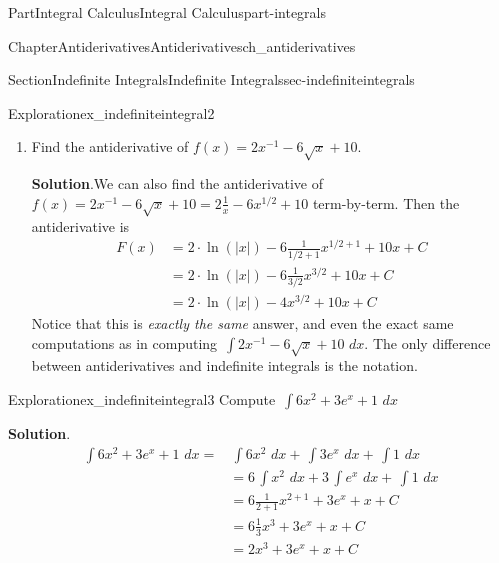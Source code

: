 \documentclass[oneside,10pt,]{tufte-book}
\newcommand{\blocktitlefont}{\relax}
\numberwithin{equation}{chapter}
\newcommand{\intdx}[1]{{\,\int#1\,\,dx}}
\newcommand{\amp}{&}
\begin{document}
\begin{partptx}{Part}{Integral Calculus}{}{Integral Calculus}{}{}{part-integrals}
\begin{chapterptx}{Chapter}{Antiderivatives}{}{Antiderivatives}{}{}{ch_antiderivatives}
\begin{sectionptx}{Section}{Indefinite Integrals}{}{Indefinite Integrals}{}{}{sec-indefiniteintegrals}
\begin{exploration}{Exploration}{}{ex_indefiniteintegral2}
\begin{enumerate}[font=\bfseries,label=(\alph*),ref=\alph*]
\begin{align*}
= \amp 2\intdx{\dfrac{1}{x}} - 6\intdx{x^{1/2}} + \intdx{10} \\
= \amp 2\ln(|x|) - 6\cdot \frac{1}{1/2+1} x^{1/2+1} + 10x + C\\
= \amp 2\ln(|x|) - 6\cdot \frac{1}{3/2}x^{3/2} + 10x + C\\
= \amp 2\ln(|x|) - 4 x^{3/2} + 10x + C
\end{align*}
%
\item{}Find the antiderivative of \(f(x) = 2x^{-1} - 6\sqrt{x} + 10\).%
\par\smallskip%
\noindent\textbf{\blocktitlefont Solution}.\hypertarget{ex_indefiniteintegral2-3-2}{}\quad{}We can also find the antiderivative of \(f(x) = 2x^{-1} - 6\sqrt{x} + 10 = 2\frac{1}{x} - 6x^{1/2} + 10\) term-by-term. Then the antiderivative is%
\begin{align*}
F(x) \amp = 2\cdot\ln(|x|) - 6\frac{1}{1/2+1}x^{1/2+1} + 10x + C \\
\amp = 2\cdot\ln(|x|) - 6\frac{1}{3/2}x^{3/2} + 10x + C \\
\amp = 2\cdot\ln(|x|) - 4x^{3/2} + 10x + C 
\end{align*}
Notice that this is \emph{exactly the same} answer, and even the exact same computations as in computing \(\intdx{ 2x^{-1} - 6\sqrt{x} + 10 }\). The only difference between antiderivatives and indefinite integrals is the notation.%
\end{enumerate}%
\end{exploration}%
\begin{exploration}{Exploration}{}{ex_indefiniteintegral3}%
Compute \(\intdx{ 6x^2 + 3e^x + 1} \)%
\par\smallskip%
\noindent\textbf{\blocktitlefont Solution}.\hypertarget{ex_indefiniteintegral3-2}{}\quad{}%
\begin{align*}
\intdx{ 6x^2 + 3e^x + 1} = \amp \intdx{6x^2} + \intdx{3e^x} + \intdx{1}  \\
\amp = 6\intdx{x^2} + 3\intdx{e^x} + \intdx{1}\\
\amp = 6\frac{1}{2+1}x^{2+1} + 3e^x + x + C\\
\amp = 6\frac{1}{3} x^3 + 3e^x + x + C\\
\amp = 2 x^3 + 3e^x + x + C
\end{align*}
%
\end{exploration}%
\end{sectionptx}
%
%
\typeout{************************************************}
\typeout{************************************************}

\end{chapterptx}
\end{partptx}
\end{document}
